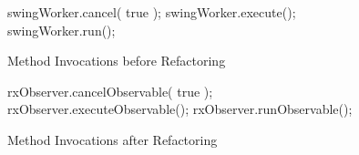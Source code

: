 \begin{figure}[H]
\begin{minipage}{0.48\textwidth}
\begin{sourcecode}
\begin{javacode}{}
swingWorker.cancel( true );
swingWorker.execute();
swingWorker.run();
\end{javacode}
\caption{Method Invocations before Refactoring}
\label{code:mi-before}
\end{sourcecode}
\end{minipage}\hspace{0.7cm}
\begin{minipage}{0.48\textwidth}
\begin{sourcecode}
\begin{javacode}{}
rxObserver.cancelObservable( true );
rxObserver.executeObservable();
rxObserver.runObservable();
\end{javacode}
\caption{Method Invocations after Refactoring}
\label{code:mi-after}
\end{sourcecode}
\end{minipage}
\end{figure}